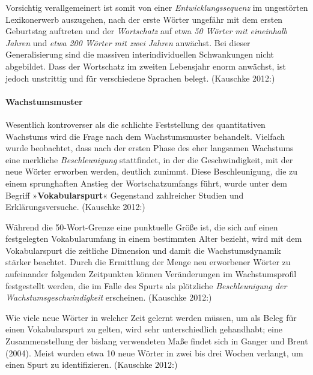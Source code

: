 \documentclass[
  letterpaper,
]{scrbook}
\let\oldparagraph\paragraph
\renewcommand{\paragraph}[1]{\oldparagraph{#1}\mbox{}}
\begin{document}
Vorsichtig verallgemeinert ist somit von einer
\emph{Entwicklungssequenz} im ungestörten Lexikonerwerb auszugehen, nach
der erste Wörter ungefähr mit dem ersten Geburtstag auftreten und der
\emph{Wortschatz} auf etwa \emph{50 Wörter mit} \emph{eineinhalb Jahren}
und \emph{etwa 200 Wörter mit zwei Jahren} anwächst. Bei dieser
Generalisierung sind die massiven interindividuellen Schwankungen nicht
abgebildet. Dass der Wortschatz im zweiten Lebensjahr enorm anwächst,
ist jedoch unstrittig und für verschiedene Sprachen belegt. (Kauschke
2012:)

\hypertarget{wachstumsmuster}{%
\paragraph{Wachstumsmuster}\label{wachstumsmuster}}

Wesentlich kontroverser als die schlichte Feststellung des quantitativen
Wachstums wird die Frage nach dem Wachstumsmuster behandelt. Vielfach
wurde beobachtet, dass nach der ersten Phase des eher langsamen
Wachstums eine merkliche \emph{Beschleunigung} stattfindet, in der die
Geschwindigkeit, mit der neue Wörter erworben werden, deutlich zunimmt.
Diese Beschleunigung, die zu einem sprunghaften Anstieg der
Wortschatzumfangs führt, wurde unter dem Begriff
»\textbf{Vokabularspurt}« Gegenstand zahlreicher Studien und
Erklärungsversuche. (Kauschke 2012:)

Während die 50-Wort-Grenze eine punktuelle Größe ist, die sich auf einen
festgelegten Vokabularumfang in einem bestimmten Alter bezieht, wird mit
dem Vokabularspurt die zeitliche Dimension und damit die
Wachstumsdynamik stärker beachtet. Durch die Ermittlung der Menge neu
erworbener Wörter zu aufeinander folgenden Zeitpunkten können
Veränderungen im Wachstumsprofil festgestellt werden, die im Falle des
Spurts als plötzliche \emph{Beschleunigung der Wachstumsgeschwindigkeit}
erscheinen. (Kauschke 2012:)

Wie viele neue Wörter in welcher Zeit gelernt werden müssen, um als
Beleg für einen Vokabularspurt zu gelten, wird sehr unterschiedlich
gehandhabt; eine Zusammenstellung der bislang verwendeten Maße findet
sich in Ganger und Brent (2004). Meist wurden etwa 10 neue Wörter in
zwei bis drei Wochen verlangt, um einen Spurt zu identifizieren.
(Kauschke 2012:)
\end{document}
